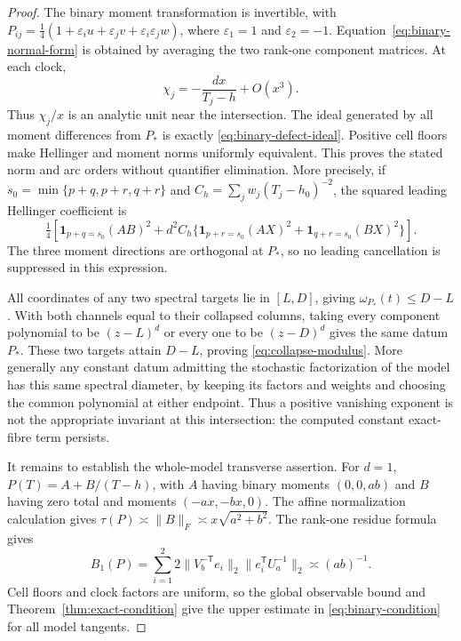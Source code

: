 \begin{proof}
The binary moment transformation is invertible, with
$P_{ij}=\tfrac14(1+\varepsilon_i u+\varepsilon_j v+
\varepsilon_i\varepsilon_j w)$, where $\varepsilon_1=1$ and
$\varepsilon_2=-1$. Equation~\eqref{eq:binary-normal-form} is obtained
by averaging the two rank-one component matrices. At each clock,
\[
 \chi_j=-\frac{d x}{T_j-h}+O(x^3).
\]
Thus $\chi_j/x$ is an analytic unit near the intersection. The ideal
generated by all moment differences from $P_*$ is exactly
\eqref{eq:binary-defect-ideal}. Positive cell floors make Hellinger
and moment norms uniformly equivalent. This proves the stated
norm and arc orders without quantifier elimination. More precisely,
if $s_0=\min\{p+q,p+r,q+r\}$ and
$C_h=\sum_jw_j(T_j-h_0)^{-2}$, the squared leading Hellinger coefficient
is
\[
 \tfrac14\left[
 \mathbf1_{p+q=s_0}(AB)^2+
 d^2C_h\{\mathbf1_{p+r=s_0}(AX)^2+
                   \mathbf1_{q+r=s_0}(BX)^2\}\right].
\]
The three moment directions are orthogonal at $P_*$, so no leading
cancellation is suppressed in this expression.

All coordinates of any two spectral targets lie in $[L,D]$, giving
$\omega_{P_*}(t)\le D-L$. With both channels equal to their collapsed
columns, taking every component polynomial to be $(z-L)^d$ or every
one to be $(z-D)^d$ gives the same datum $P_*$. These two targets
attain $D-L$, proving \eqref{eq:collapse-modulus}. More generally any
constant datum admitting the stochastic factorization of the model
has this same spectral diameter, by keeping its factors and weights
and choosing the common polynomial at either endpoint. Thus a positive
vanishing exponent is not the appropriate invariant at this
intersection: the computed constant exact-fibre term persists.

It remains to establish the whole-model transverse assertion. For
$d=1$, $P(T)=A+B/(T-h)$, with $A$ having binary moments $(0,0,ab)$
and $B$ having zero total and moments $(-ax,-bx,0)$. The affine
normalization calculation gives
$\tau(P)\asymp\|B\|_F\asymp x\sqrt{a^2+b^2}$.
The rank-one residue formula gives
\[
 B_1(P)=\sum_{i=1}^2
       2\|V_b^{-\mathsf T}e_i\|_2\|e_i^{\mathsf T}U_a^{-1}\|_2
                       \asymp (ab)^{-1}.
\]
Cell floors and clock factors are uniform, so the global observable
bound and Theorem~\ref{thm:exact-condition} give the upper estimate
in \eqref{eq:binary-condition} for all model tangents.


\end{proof}
